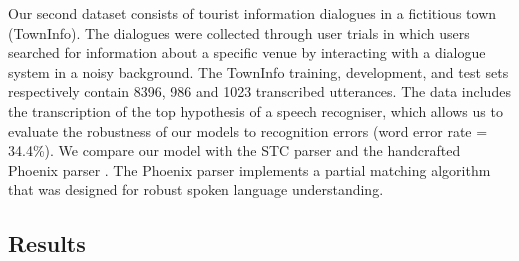\documentclass{article}
\begin{document}
Our second dataset consists of tourist information dialogues in a fictitious town (TownInfo). The dialogues were collected through user trials in which users searched for information about a specific venue by interacting with a dialogue system in a noisy background. 
The TownInfo training, development, and test sets respectively contain 8396, 986 and 1023 transcribed utterances.  The data includes the transcription of the top hypothesis of a speech recogniser, which allows us to evaluate the robustness of our models to recognition errors (word error rate = 34.4\%). 
We compare our model with the STC parser \cite{mairesse09} and the handcrafted Phoenix parser \cite{ward91}. The Phoenix parser implements a partial matching algorithm that was designed for robust spoken language understanding.

\subsection{Results}
\end{document}
